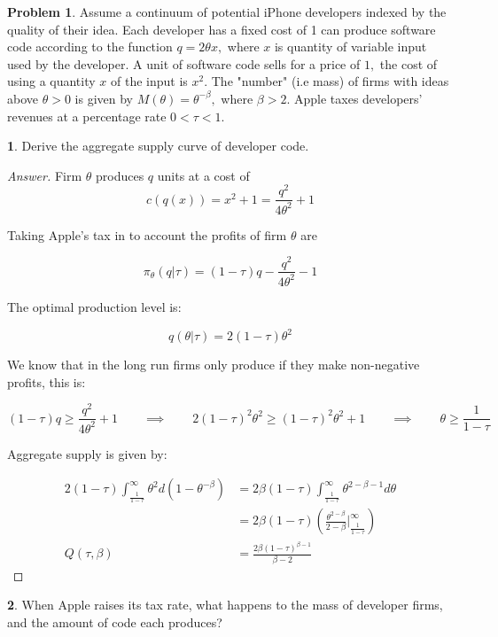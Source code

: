 \documentclass[12pt]{article}
\theoremstyle{definition}
\newtheorem{problem}{Problem}
\newtheorem{subproblem}{}[problem]
\newcommand{\qiq}{\qquad \implies \qquad}
\begin{document}
\begin{problem}
Assume a continuum of potential iPhone developers indexed by the quality of their idea. Each developer has a fixed cost of 1 can produce software code according to the function $q=2 \theta x,$ where $x$ is quantity of variable input used by the developer. A unit of software code sells for a price of $1,$ the cost of using a quantity $x$ of the input is $x^{2} .$ The "number" (i.e mass) of firms with ideas above $\theta>0$ is given by $M(\theta)=\theta^{-\beta},$ where $\beta>2$. Apple taxes developers' revenues at a percentage rate $0<\tau<1$.
\begin{subproblem}
    Derive the aggregate supply curve of developer code.
\end{subproblem}
\begin{proof}[Answer]
    Firm $\theta$ produces $q$ units at a cost of 
$$c(q(x)) = x^2 + 1 = \frac{q^2}{4\theta^2} + 1$$

Taking Apple's tax in to account the profits of firm $\theta$ are

$$\pi_\theta (q|\tau) = (1-\tau)q - \frac{q^2}{4\theta^2} - 1$$ 

The optimal production level is:

$$q(\theta|\tau) = 2(1-\tau)\theta^2$$

We know that in the long run firms only produce if they make non-negative profits, this is:

$$(1-\tau)q \geq  \frac{q^2}{4\theta^2} + 1 \qiq 2(1-\tau)^2\theta^2 \geq (1-\tau)^2\theta^2  + 1 \qiq \theta \geq \frac{1}{1-\tau}$$ 

Aggregate supply is given by:

\begin{align*}
2(1-\tau)\int_{\frac{1}{1-\tau}}^{\infty}{\theta^2d(1-\theta^{-\beta})} &= 2\beta(1-\tau)\int_{\frac{1}{1-\tau}}^{\infty}{\theta^{2-\beta-1}d\theta}\\
&= 2\beta(1-\tau) \left(\frac{\theta^{2-\beta}}{2-\beta} \Big|_{\frac{1}{1-\tau}}^\infty \right)\\
  Q(\tau,\beta)&=\frac{2\beta(1-\tau)^{\beta-1}}{\beta-2}
\end{align*}

\end{proof}

\begin{subproblem}
 When Apple raises its tax rate, what happens to the mass of developer firms, and the amount of code each produces?
\end{subproblem}


\end{problem}
\end{document}
